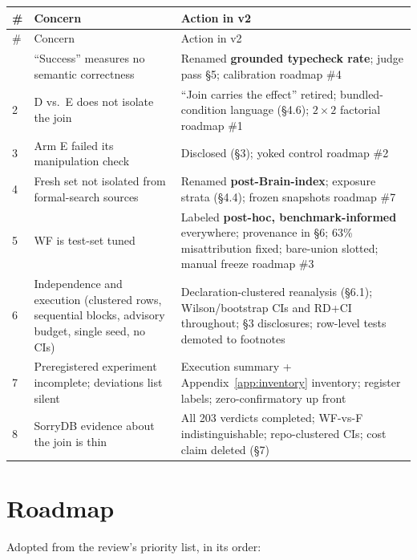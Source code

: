 \documentclass[10pt]{article}
\begin{document}
{\footnotesize
\begin{longtable}{@{}p{}p{}p{}@{}}
\toprule
\# & Concern & Action in v2 \\
\midrule
\endfirsthead
\toprule
\# & Concern & Action in v2 \\
\midrule
\endhead
\bottomrule
\endfoot
\bottomrule
\endlastfoot
1 & ``Success'' measures no semantic correctness & Renamed
\textbf{grounded typecheck rate}; judge pass \S5; calibration roadmap \#4 \\
2 & D vs.\ E does not isolate the join & ``Join carries the effect''
retired; bundled-condition language (\S4.6); $2\times2$ factorial roadmap
\#1 \\
3 & Arm E failed its manipulation check & Disclosed (\S3); yoked control
roadmap \#2 \\
4 & Fresh set not isolated from formal-search sources & Renamed
\textbf{post-Brain-index}; exposure strata (\S4.4); frozen snapshots
roadmap \#7 \\
5 & WF is test-set tuned & Labeled \textbf{post-hoc, benchmark-informed}
everywhere; provenance in \S6; 63\% misattribution fixed; bare-union
slotted; manual freeze roadmap \#3 \\
6 & Independence and execution (clustered rows, sequential blocks,
advisory budget, single seed, no CIs) & Declaration-clustered reanalysis
(\S6.1); Wilson/bootstrap CIs and RD+CI throughout; \S3 disclosures;
row-level tests demoted to footnotes \\
7 & Preregistered experiment incomplete; deviations list silent &
Execution summary + Appendix~\ref{app:inventory} inventory; register
labels; zero-confirmatory up front \\
8 & SorryDB evidence about the join is thin & All 203 verdicts completed;
WF-vs-F indistinguishable; repo-clustered CIs; cost claim deleted (\S7) \\
\end{longtable}
}

\section{Roadmap}\label{sec:roadmap}

Adopted from the review's priority list, in its order:
\end{document}

